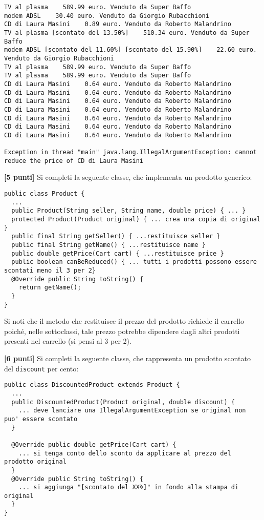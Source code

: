 \documentclass{article}[10pt]
\newcounter{esnu}
\newenvironment{esercizio}{\medskip \noindent {\bf Esercizio\addtocounter{esnu}{1} \arabic{esnu}}}{}
\begin{document}
{\small
\begin{verbatim}
TV al plasma    589.99 euro. Venduto da Super Baffo
modem ADSL    30.40 euro. Venduto da Giorgio Rubacchioni
CD di Laura Masini    0.89 euro. Venduto da Roberto Malandrino
TV al plasma [scontato del 13.50%]    510.34 euro. Venduto da Super Baffo
modem ADSL [scontato del 11.60%] [scontato del 15.90%]    22.60 euro. Venduto da Giorgio Rubacchioni
TV al plasma    589.99 euro. Venduto da Super Baffo
TV al plasma    589.99 euro. Venduto da Super Baffo
CD di Laura Masini    0.64 euro. Venduto da Roberto Malandrino
CD di Laura Masini    0.64 euro. Venduto da Roberto Malandrino
CD di Laura Masini    0.64 euro. Venduto da Roberto Malandrino
CD di Laura Masini    0.64 euro. Venduto da Roberto Malandrino
CD di Laura Masini    0.64 euro. Venduto da Roberto Malandrino
CD di Laura Masini    0.64 euro. Venduto da Roberto Malandrino
CD di Laura Masini    0.64 euro. Venduto da Roberto Malandrino

Exception in thread "main" java.lang.IllegalArgumentException: cannot reduce the price of CD di Laura Masini
\end{verbatim}}

\begin{esercizio}
\textbf{[5 punti]}
%
Si completi la seguente classe, che implementa un prodotto generico:
{\small
\begin{verbatim}
public class Product {
  ...
  public Product(String seller, String name, double price) { ... }
  protected Product(Product original) { ... crea una copia di original }
  public final String getSeller() { ...restituisce seller }
  public final String getName() { ...restituisce name }
  public double getPrice(Cart cart) { ...restituisce price }
  public boolean canBeReduced() { ... tutti i prodotti possono essere scontati meno il 3 per 2}
  @Override public String toString() {
    return getName();
  }
}
\end{verbatim}}

\noindent
Si noti che il metodo che restituisce il prezzo del prodotto richiede il carrello poich\'e, nelle sottoclassi, tale
prezzo potrebbe dipendere dagli altri prodotti presenti nel carrello (si pensi al 3 per 2).
\end{esercizio}

\begin{esercizio}
\textbf{[6 punti]}
%
Si completi la seguente classe, che rappresenta un prodotto scontato del \texttt{discount} per cento:
%
{\small
\begin{verbatim}
public class DiscountedProduct extends Product {
  ...
  public DiscountedProduct(Product original, double discount) {
    ... deve lanciare una IllegalArgumentException se original non puo' essere scontato
  }

  @Override public double getPrice(Cart cart) {
    ... si tenga conto dello sconto da applicare al prezzo del prodotto original
  }
  @Override public String toString() {
    ... si aggiunga "[scontato del XX%]" in fondo alla stampa di original
  }
}
\end{verbatim}}
\end{esercizio}
\end{document}
